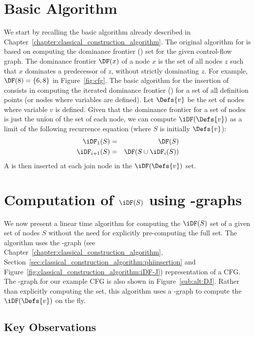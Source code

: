 {\section{Basic Algorithm} \label{section:alternative_ssa_construction_algorithms:cytron}
We start by recalling the basic algorithm already described in Chapter~\ref{chapter:classical_construction_algorithm}. 
The original algorithm for  \phifuns is based on computing the dominance frontier (\DF) set for the given control-flow graph. 
The dominance frontier $\DF(x)$ of a node $x$ is the set of all nodes $z$ such that $x$ dominates a predecessor of $z$, without strictly dominating $z$. 
For example, $\DF(8)= \{ 6, 8 \}$ in Figure~\ref{fig:cfg}. 
The basic algorithm for the insertion of \phifuns consists in computing the iterated dominance frontier (\iDF) for a set of all definition points (or nodes where variables are defined). 
Let $\Defs{v}$ be the set of nodes where variable $v$ is defined. 
Given that the dominance frontier for a set of nodes is just the union of the \DF set of each node, we can compute $\iDF(\Defs{v})$ as a limit of the following recurrence equation (where $S$ is initially $\Defs{v}$): \begin{eqnarray*} \iDF_1(S) &=& \DF(S) \\ \iDF_{i+1} (S) &=& \DF(S \cup \iDF_i(S))  \end{eqnarray*}
A \phifun is then inserted at each join node in the  $\iDF(\Defs{v})$ set. 

\section{Computation of $\iDF(S)$ using \DJ-graphs}
\label{section:alternative_ssa_construction_algorithms:sreedhar}
We now present a linear time algorithm for computing the $\iDF(S)$ set of a given set of nodes $S$ without the need for explicitly pre-computing the full \DF set. 
The algorithm uses the \DJ-graph (see Chapter~\ref{chapter:classical_construction_algorithm}, Section~\ref{sec:classical_construction_algorithm:phiinsertion} and Figure~\ref{fig:classical_construction_algorithm:iDF-J}) representation of a CFG. 
The \DJ-graph for our example CFG is also shown in Figure~\ref{sub:alt:DJ}. 
Rather than explicitly computing the \DF set, this algorithm uses a \DJ-graph to compute the $\iDF(\Defs{v})$ on the fly.

\subsection{Key Observations} 
 
}
